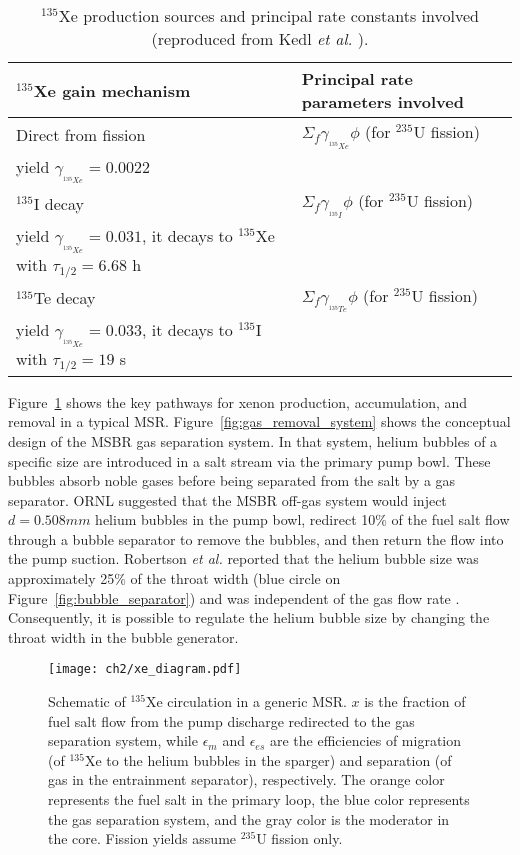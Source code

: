 \begin{table}[ht!]
	\caption{$^{135}$Xe production sources and principal rate constants 
		involved (reproduced from Kedl \emph{et al.} 
		\cite{kedl_development_1967}).}
	\centering
	\begin{tabularx}{\textwidth}{b  b}
		\hline \textbf{$^{135}$Xe gain mechanism} & \textbf{Principal rate 
			parameters involved}  	\\ [5pt] \hline 
		Direct from fission & $\Sigma_f \gamma_{_{^{135}Xe}}\phi$ (for 
		$^{235}$U fission) \\
		yield $\gamma_{_{^{135}Xe}}\!\!\!=0.0022$ & \\ [5pt] \hline 
		$^{135}$I decay     & $\Sigma_f \gamma_{_{^{135}I}}\phi$ (for 
		$^{235}$U fission) \\
		yield $\gamma_{_{^{135}Xe}}\!\!\!=0.031$, it decays to $^{135}$Xe with 
		$\tau_{1/2}=6.68$ h & 			                    \\	[5pt]	\hline 
		$^{135}$Te decay    & $\Sigma_f \gamma_{_{^{135}Te}}\phi$ (for 
		$^{235}$U 		fission) \\
		yield $\gamma_{_{^{135}Xe}}\!\!\!=0.033$, 
		it decays to $^{135}$I with $\tau_{1/2}=19$ s 
		& 			                    \\ [5pt]	\hline
	\end{tabularx}
	\label{tab:xe_gain}
\end{table}
Figure~\ref{fig:xe_diagram} shows the key pathways for xenon production, 
accumulation, and removal in a typical \gls{MSR}.  
Figure~\ref{fig:gas_removal_system} shows the conceptual design of the  
\gls{MSBR} gas separation system. In that system, helium bubbles of a specific 
size are introduced in a salt stream via the primary pump bowl. These bubbles 
absorb noble gases before being separated from the salt by a gas separator. 
\gls{ORNL} suggested that the \gls{MSBR} off-gas system would inject 
$d=0.508mm$ helium bubbles in the pump bowl, redirect 10\% of the fuel salt 
flow through a bubble separator to remove the bubbles, and then return the 
flow into the pump suction. Robertson \emph{et al.} reported that the helium 
bubble size was approximately 25\% of the throat width (blue circle on 
Figure~\ref{fig:bubble_separator}) and was independent of the gas flow rate 
\cite{robertson_conceptual_1971}. Consequently, it is possible to regulate the 
helium bubble size by changing the throat width in the bubble generator.
\begin{figure}[htp!] %
	\centering
	\texttt{[image: ch2/xe\_diagram.pdf]}
	\caption{Schematic of $^{135}$Xe circulation in a generic \gls{MSR}. $x$ 
	is the fraction of fuel salt flow from the pump discharge redirected to 
	the gas separation system, while $\epsilon_m$ and $\epsilon_{es}$ are the 
	efficiencies of migration (of $^{135}$Xe to the helium bubbles in the 
	sparger) and separation (of gas in the entrainment separator), 
	respectively. The orange color represents the fuel salt in the primary 
	loop, the blue color represents the gas separation system, and the gray 
	color is the moderator in the core. Fission yields assume $^{235}$U 
	fission 	only.}
	\label{fig:xe_diagram}
\end{figure}
